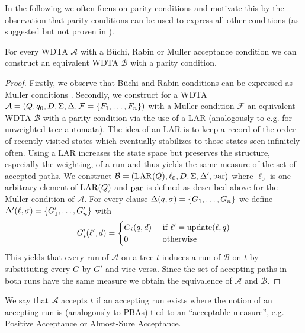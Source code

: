 In the following we often focus on parity conditions and motivate this by the
observation that parity conditions can be used to express all other conditions
(as suggested but not proven in \cite[page 24:9]{RandAutoInfTrees}).
\begin{lemma}
  For every \ac{WDTA} $\mathcal{A}$ with a Büchi, Rabin or Muller
  acceptance condition we can construct an equivalent \ac{WDTA} $\mathcal{B}$
  with a parity condition.
\end{lemma}
\begin{proof}
  Firstly, we observe that Büchi and Rabin conditions can be expressed
  as Muller conditions \cite[Proposition 5.3]{LangAutoLog}. Secondly, we
  construct for a \ac{WDTA} $\mathcal{A} = \left(Q, q_{0}, D, \Sigma, \Delta,
  \mathcal{F} = \left\{F_{1},\dots,F_{n}\right\}\right)$ with a Muller condition $\mathcal{F}$
  an equivalent \ac{WDTA} $\mathcal{B}$ with a parity condition via the use of
  a \ac{LAR} (analogously to e.g. \cite{SimAltTreeAuto} for unweighted tree
  automata). The idea of an \ac{LAR} is to keep a record of the order of
  recently visited states which eventually stabilizes to those states seen
  infinitely often. Using a \ac{LAR} increases the state space but preserves
  the structure, especially the weighting, of a run and thus yields the same
  measure of the set of accepted paths. 
  We construct
  $\mathcal{B}=\left(\operatorname{LAR}(Q),\ell_{0}, D, \Sigma, \Delta',\operatorname{par}\right)$ where
  $\ell_{0}$ is one arbitrary element of $\operatorname{LAR}(Q)$ and $\operatorname{par}$ is defined as
  described above for the Muller condition of $\mathcal{A}$. For every clause
  $\Delta(q,\sigma) = \left\{G_{1},\dots,G_{n}\right\}$ we define
  $\Delta'(\ell,\sigma) = \left\{G_{1}',\dots,G_{n}'\right\}$ with
  \begin{equation*}
    G_{i}'(\ell', d) = \begin{cases}
      G_{i}(q,d) &\text{ if }\ell' = \operatorname{update}(\ell,q)\\
      0          &\text{ otherwise}
    \end{cases}
  \end{equation*}
  This yields that every run of $\mathcal{A}$ on a tree $t$ induces a run of
  $\mathcal{B}$ on $t$ by substituting every $G$ by $G'$ and vice versa. Since
  the set of accepting paths in both runs have the same measure we obtain the
  equivalence of $\mathcal{A}$ and $\mathcal{B}$.
\end{proof}
We say that $\mathcal{A}$ accepts $t$ if an accepting run exists where the
notion of an accepting run is (analogously to \acp{PBA}) tied to an
\enquote{acceptable measure}, e.g. Positive Acceptance or Almost-Sure
Acceptance.


